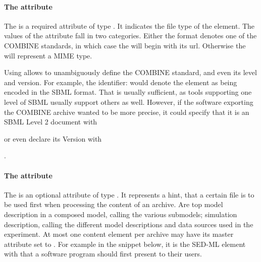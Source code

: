\paragraph{The  attribute}
The  is a required attribute of type . It 
indicates the file type of the \Content element. The values of the 
 attribute fall in two categories. Either the format 
denotes one of the COMBINE standards, in which case the  
will begin with its  url. Otherwise the 
 will represent a MIME type. 

Using  allows to unambiguously define the COMBINE standard, and even its level and version. For example, the identifier:  would denote the \Content 
element as being encoded in the SBML format. That is usually sufficient, as tools supporting one level of SBML usually
support others as well. However, if the software exporting the COMBINE archive wanted to be more precise, it could specify that it is an SBML Level 2 document with 

\begin{center}
\end{center}

or even declare its Version with 

\begin{center}
.
\end{center}


\paragraph{The  attribute}
\label{active_document}
The  is an optional attribute of type . It 
represents a hint, that a certain file is to be used first when 
processing the content of an archive. Are top model description in a 
composed model, calling the various submodels; simulation description, 
calling the different model descriptions and data sources used in the 
experiment. At most one content element per archive may have its master 
attribute set to . For example in the snippet below, it is the 
SED-ML element with  that a software 
program should first present to their users.

